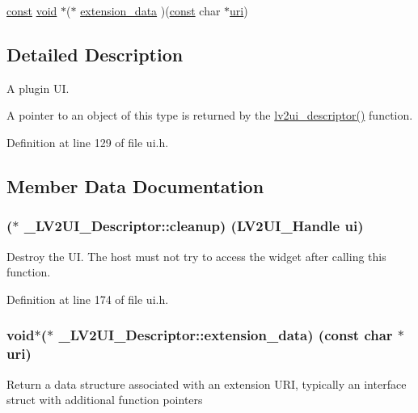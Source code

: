 \begin{DoxyCompactItemize}
\item 
\hyperlink{getopt1_8c_a2c212835823e3c54a8ab6d95c652660e}{const} \hyperlink{sound_8c_ae35f5844602719cf66324f4de2a658b3}{void} $\ast$($\ast$ \hyperlink{struct___l_v2_u_i___descriptor_a274b7f41cbcb9fdab6f936a1bcef1863}{extension\+\_\+data} )(\hyperlink{getopt1_8c_a2c212835823e3c54a8ab6d95c652660e}{const} char $\ast$\hyperlink{lib_2expat_8h_a5a9fdd6c2606370ad12f24c078ac6585}{uri})
\end{DoxyCompactItemize}


\subsection{Detailed Description}
A plugin UI.

A pointer to an object of this type is returned by the \hyperlink{ui_8h_a6dc4592443f005492052966c5e95ebae}{lv2ui\+\_\+descriptor()} function. 

Definition at line 129 of file ui.\+h.



\subsection{Member Data Documentation}
\subsubsection[{\texorpdfstring{cleanup}{cleanup}}]{($\ast$ \+\_\+\+L\+V2\+U\+I\+\_\+\+Descriptor\+::cleanup) ({\bf L\+V2\+U\+I\+\_\+\+Handle} ui)}\hypertarget{struct___l_v2_u_i___descriptor_ac9f3bd154ae7fabd8348db1b8e223048}{}\label{struct___l_v2_u_i___descriptor_ac9f3bd154ae7fabd8348db1b8e223048}
Destroy the UI. The host must not try to access the widget after calling this function. 

Definition at line 174 of file ui.\+h.

\subsubsection[{\texorpdfstring{extension\+\_\+data}{extension_data}}]{ {\bf void}$\ast$($\ast$ \+\_\+\+L\+V2\+U\+I\+\_\+\+Descriptor\+::extension\+\_\+data) ({\bf const} char $\ast${\bf uri})}\hypertarget{struct___l_v2_u_i___descriptor_a274b7f41cbcb9fdab6f936a1bcef1863}{}\label{struct___l_v2_u_i___descriptor_a274b7f41cbcb9fdab6f936a1bcef1863}
Return a data structure associated with an extension U\+RI, typically an interface struct with additional function pointers

